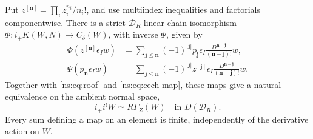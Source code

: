 \begin{theorem}
\label{ns:thm:pushforward}
Put \(z^{[\boldsymbol n]}=\prod_i z_i^{n_i}/n_i!\), and use
multiindex inequalities and factorials componentwise.
There is a strict \(\mathcal D_R\)-linear chain isomorphism
\(\Phi:i_+K(W,N)\to C_\delta(W)\), with inverse \(\Psi\), given by
\begin{align}
 \Phi(z^{[\boldsymbol n]}\epsilon_Iw)
  &=\sum_{\boldsymbol j\leq\boldsymbol n}(-1)^{|\boldsymbol j|}
       p_{\boldsymbol j}\epsilon_I
       \frac{D^{\boldsymbol n-\boldsymbol j}}
            {(\boldsymbol n-\boldsymbol j)!}w,
       \label{ns:eq:phi}\\
 \Psi(p_{\boldsymbol n}\epsilon_Iw)
  &=\sum_{\boldsymbol j\leq\boldsymbol n}(-1)^{|\boldsymbol j|}
       z^{[\boldsymbol j]}\epsilon_I
       \frac{D^{\boldsymbol n-\boldsymbol j}}
            {(\boldsymbol n-\boldsymbol j)!}w.
       \label{ns:eq:psi}
\end{align}
Together with \eqref{ns:eq:roof} and \eqref{ns:eq:cech-map}, these
maps give a natural equivalence on the ambient normal space,
\begin{equation}\label{ns:eq:supported-equivalence}
 i_+i^!W\simeq R\Gamma_Z(W)\quad\text{in }D(\mathcal D_R).
\end{equation}
Every sum defining a map on an element is finite, independently of
the derivative action on \(W\).
\end{theorem}

